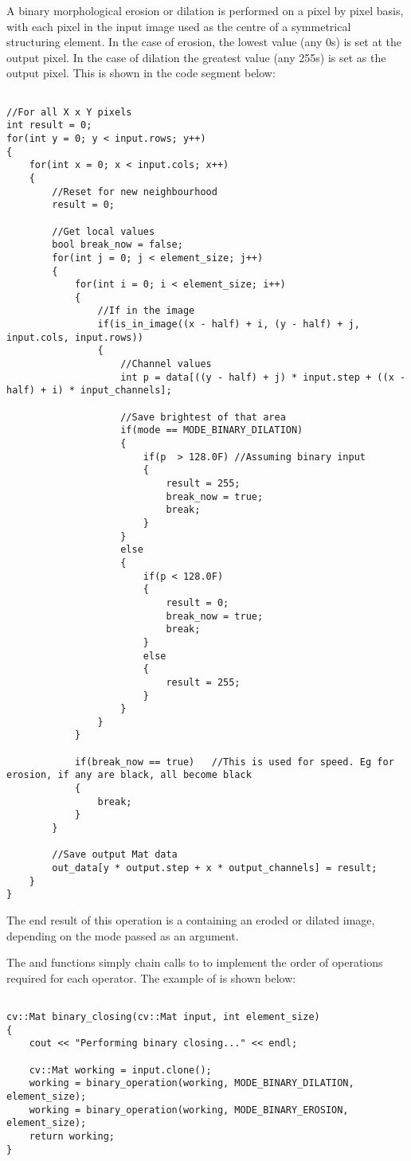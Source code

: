 			A binary morphological erosion or dilation is performed on a pixel by pixel basis, with each pixel in the input image used as the centre of a symmetrical structuring element. In the case of erosion, the lowest value (any 0s) is set at the output pixel. In the case of dilation the greatest value (any 255s) is set as the output pixel. This is shown in the code segment below:

			\begin{lstlisting}

//For all X x Y pixels
int result = 0;
for(int y = 0; y < input.rows; y++)
{
	for(int x = 0; x < input.cols; x++)
	{
		//Reset for new neighbourhood
		result = 0;
			
		//Get local values
		bool break_now = false;
		for(int j = 0; j < element_size; j++)
		{
			for(int i = 0; i < element_size; i++)
			{
				//If in the image
				if(is_in_image((x - half) + i, (y - half) + j, input.cols, input.rows))
				{
					//Channel values
					int p = data[((y - half) + j) * input.step + ((x - half) + i) * input_channels];

					//Save brightest of that area
					if(mode == MODE_BINARY_DILATION)
					{
						if(p  > 128.0F) //Assuming binary input
						{
							result = 255;
							break_now = true;
							break;
						}
					}
					else
					{
						if(p < 128.0F)
						{
							result = 0;
							break_now = true;
							break;
						}
						else
						{
							result = 255;
						}
					}
				}
			}

			if(break_now == true)   //This is used for speed. Eg for erosion, if any are black, all become black
			{
				break;
			}
		}
	
		//Save output Mat data
		out_data[y * output.step + x * output_channels] = result;
	}
}
			\end{lstlisting}

			The end result of this operation is a  containing an eroded or dilated image, depending on the mode passed as an argument. 

			The  and  functions simply chain calls to  to implement the order of operations required for each operator. The example of  is shown below:

			\begin{lstlisting}

cv::Mat binary_closing(cv::Mat input, int element_size)
{
	cout << "Performing binary closing..." << endl;

	cv::Mat working = input.clone();
	working = binary_operation(working, MODE_BINARY_DILATION, element_size);
	working = binary_operation(working, MODE_BINARY_EROSION, element_size);
	return working;
}
			\end{lstlisting}

